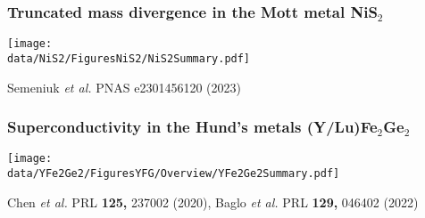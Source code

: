 %
%
%
%
%
%

\begin{emptyframe}
    \frametitle{Truncated mass divergence in the Mott metal NiS$_2$}
    \centerline{ \texttt{[image: \\data/NiS2/FiguresNiS2/NiS2Summary.pdf]}}
\vspace{-1 em}
\vfill
\centerline{\makebox[\linewidth]{\rule{0.85\textwidth}{0.4pt}}}
\centerline{\scriptsize Semeniuk {\it et al.} PNAS e2301456120 (2023)}
\end{emptyframe}

\begin{emptyframe}
    \frametitle{Superconductivity in the Hund's metals (Y/Lu)Fe$_2$Ge$_2$}
    \centerline{ \texttt{[image: \\data/YFe2Ge2/FiguresYFG/Overview/YFe2Ge2Summary.pdf]}}
\vspace{-1 em}
\vfill 
\centerline{\makebox[\linewidth]{\rule{0.85\textwidth}{0.4pt}}}
\centerline{\scriptsize Chen {\it et al.} PRL {\bf 125,} 237002 (2020), Baglo {\it et al.} PRL {\bf 129,} 046402 (2022)}
\end{emptyframe}

